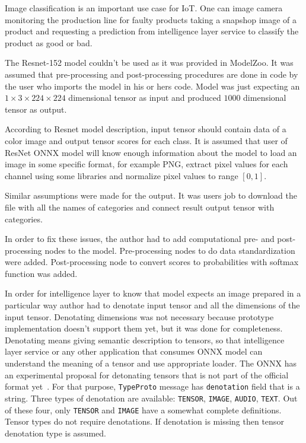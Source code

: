 \documentclass[english, 12pt, a4paper, elec, utf8, online]{aaltothesis}
\begin{document}
Image classification is an important use case for IoT. One can image camera monitoring the production line for faulty products taking a snapshop image of a product and requesting a prediction from intelligence layer service to classify the product as good or bad.        

The Resnet-152 model couldn't be used as it was provided in ModelZoo. It was assumed that pre-processing and post-processing procedures are done in code by the user who imports the model in his or hers code. Model was just expecting an $1 \times 3 \times 224 \times 224$ dimensional tensor as input and produced $1000$ dimensional tensor as output.

According to Resnet model description, input tensor should contain data of a color image and output tensor scores for each class. It is assumed that user of ResNet ONNX model will know enough information about the model to load an image in some specific format, for example PNG, extract pixel values for each channel using some libraries and normalize pixel values to range $[0,1]$. 

Similar assumptions were made for the output. It was users job to download the file with all the names of categories and connect result output tensor with categories. 

In order to fix these issues, the author had to add computational pre- and post-processing nodes to the model. Pre-processing nodes to do data standardization were added. Post-processing node to convert scores to probabilities with softmax function was added.

In order for intelligence layer to know that model expects an image prepared in a particular way author had to denotate input tensor and all the dimensions of the input tensor. Denotating dimensions was not necessary because prototype implementation doesn't support them yet, but it was done for completeness. Denotating means giving semantic description to tensors, so that intelligence layer service or any other application that consumes ONNX model can understand the meaning of a tensor and use appropriate loader. The ONNX has an experimental proposal for detonating tensors that is not part of the official format yet~\cite{onnx_denotations}. For that purpose, \texttt{TypeProto} message has \texttt{denotation} field that is a string. Three types of denotation are available: \texttt{TENSOR}, \texttt{IMAGE}, \texttt{AUDIO}, \texttt{TEXT}. Out of these four, only \texttt{TENSOR} and \texttt{IMAGE} have a somewhat complete definitions. Tensor types do not require denotations. If denotation is missing then tensor denotation type is assumed.
\end{document}

